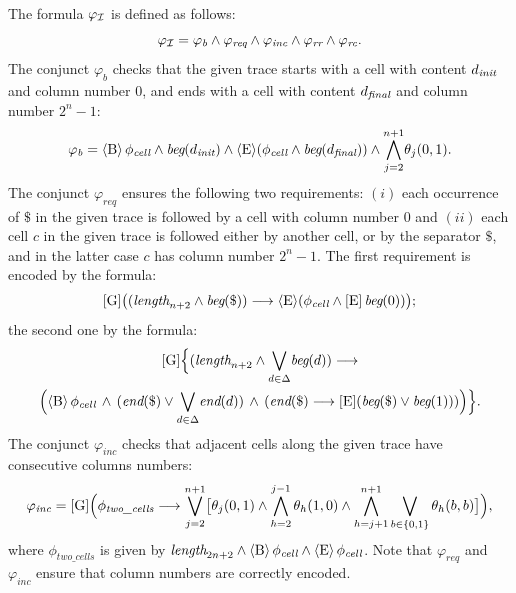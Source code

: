 The formula $\varphi_{\mathcal{I}}$ is defined as follows:
\[
\varphi_{\mathcal{I}}= \varphi_{\textit{b}} \wedge \varphi_{\textit{req}}\wedge \varphi_{\textit{inc}}\wedge \varphi_{\textit{rr}}\wedge \varphi_{\textit{rc}}.
\]
The conjunct $\varphi_{\textit{b}}$ checks that the given trace starts with a cell with content $d_{\textit{init}}$ and column number $0$, and ends with a cell with content $d_{\textit{final}}$
and column number $2^{n}-1$:
\[
\varphi_{\textit{b}} = \operatorname{\langle B\rangle}\phi_{\textit{cell}}\wedge \textit{beg}(d_{\textit{init}}) \wedge  \operatorname{\langle E\rangle}(\phi_{\textit{cell}} \wedge \textit{beg}(d_{\textit{final}})) \wedge
\displaystyle{\bigwedge_{j=2}^{n+1}}\theta_j(0,1). 
\]
%
The conjunct $\varphi_{\textit{req}}$ ensures the following two requirements:
$(i)$ each occurrence of $\$$ in the given trace is followed by a cell with column number $0$ and
$(ii)$ each cell $c$ in the given trace is followed either by another cell, or by the separator $\$$, and in the latter case $c$ has column number $2^{n}-1$.
%
The first requirement is encoded by the formula: %
\[
\operatorname{\mathopen[ G \mathclose]}\bigl((\textit{length}_{n+2} \wedge \textit{beg}(\$)) \longrightarrow \operatorname{\langle E\rangle}(\phi_{\textit{cell}}\wedge \operatorname{\mathopen[ E \mathclose]}\textit{beg}(0))\bigr);
\]
the second one by the formula:
\begin{multline*}
\operatorname{\mathopen[ G \mathclose]}\Bigl\{(\textit{length}_{n+2} \wedge \displaystyle{\bigvee_{d\in \Delta}} \textit{beg}(d)) \longrightarrow\\
\Bigl(\operatorname{\langle B\rangle}\phi_{\textit{cell}} \,\wedge\,  (\textit{end}(\$)\vee \displaystyle{\bigvee_{d\in \Delta}} \textit{end}(d))\, \wedge\, (\textit{end}(\$) \longrightarrow \operatorname{\mathopen[ E \mathclose]}(\textit{beg}(\$)\vee \textit{beg}(1)))\Bigr)\Bigr\}.
\end{multline*}
%
The conjunct $\varphi_{\textit{inc}}$  checks that adjacent cells along the given trace have consecutive columns numbers:
%
\[
\varphi_{\textit{inc}} = \operatorname{\mathopen[ G \mathclose]}\Bigl( \phi_{\textit{two\_cells}} \longrightarrow \displaystyle{\bigvee_{j=2}^{n+1}}\bigl[\theta_j(0,1)\wedge \bigwedge_{h=2}^{j-1}\theta_h(1,0) \wedge \bigwedge_{h=j+1}^{n+1}\bigvee_{b\in\{0,1\}}\theta_h(b,b)\bigr]\Bigr ),
\]
where $\phi_{\textit{two\_cells}}$ is given by
$
\textit{length}_{2n+2}\wedge  \operatorname{\langle B\rangle}\phi_{\textit{cell}}\wedge  \operatorname{\langle E\rangle}\phi_{\textit{cell}}
$.
%
Note that $\varphi_{\textit{req}}$ and $\varphi_{\textit{inc}}$ ensure that column numbers are correctly encoded.

